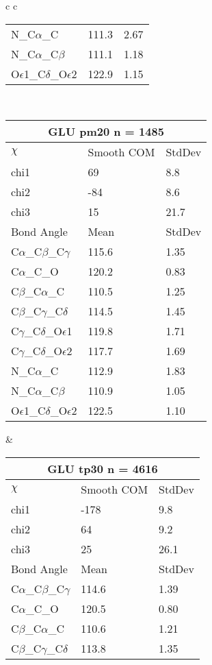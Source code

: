 \begin{longtable}{ c c }
\begin{tabular}{ l l l }
  N\_C$\alpha$\_C & 111.3 & 2.67\\
  N\_C$\alpha$\_C$\beta$ & 111.1 & 1.18\\
  O$\epsilon$1\_C$\delta$\_O$\epsilon$2 & 122.9 & 1.15\\
  \bottomrule
  \end{tabular}
  \\
  \begin{tabular}{ l l l }
  \toprule
  \multicolumn{3}{c}{GLU \textbf{pm20} n = 1485} \\ \toprule
  $\chi$       & Smooth COM & StdDev \\ \midrule
  chi1 & 69 & 8.8 \\ 
  chi2 & -84 & 8.6 \\ 
  chi3 & 15 & 21.7 \\ \midrule
  Bond Angle   & Mean     & StdDev \\ \midrule
  C$\alpha$\_C$\beta$\_C$\gamma$ & 115.6 & 1.35\\
  C$\alpha$\_C\_O & 120.2 & 0.83\\
  C$\beta$\_C$\alpha$\_C & 110.5 & 1.25\\
  C$\beta$\_C$\gamma$\_C$\delta$ & 114.5 & 1.45\\
  C$\gamma$\_C$\delta$\_O$\epsilon$1 & 119.8 & 1.71\\
  C$\gamma$\_C$\delta$\_O$\epsilon$2 & 117.7 & 1.69\\
  N\_C$\alpha$\_C & 112.9 & 1.83\\
  N\_C$\alpha$\_C$\beta$ & 110.9 & 1.05\\
  O$\epsilon$1\_C$\delta$\_O$\epsilon$2 & 122.5 & 1.10\\
  \bottomrule
  \end{tabular}
  &
  \begin{tabular}{ l l l }
  \toprule
  \multicolumn{3}{c}{GLU \textbf{tp30} n = 4616} \\ \toprule
  $\chi$       & Smooth COM & StdDev \\ \midrule
  chi1 & -178 & 9.8 \\ 
  chi2 & 64 & 9.2 \\ 
  chi3 & 25 & 26.1 \\ \midrule
  Bond Angle   & Mean     & StdDev \\ \midrule
  C$\alpha$\_C$\beta$\_C$\gamma$ & 114.6 & 1.39\\
  C$\alpha$\_C\_O & 120.5 & 0.80\\
  C$\beta$\_C$\alpha$\_C & 110.6 & 1.21\\
  C$\beta$\_C$\gamma$\_C$\delta$ & 113.8 & 1.35\\

\end{tabular}
\end{longtable}

